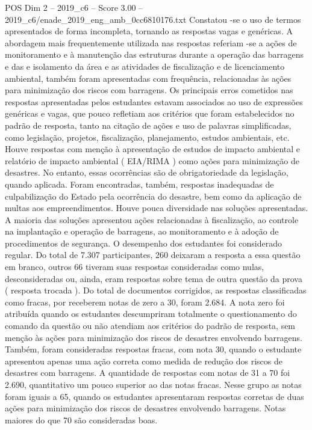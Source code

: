 \begin{textsample}{POS Dim 2 – 2019\_c6 – Score 3.00 – 2019\_c6/enade\_2019\_eng\_amb\_0cc6810176.txt}
Constatou -se o uso de termos apresentados de forma incompleta, tornando as respostas vagas e genéricas.
A abordagem mais frequentemente utilizada nas respostas referiam -se a ações de monitoramento e à manutenção das estruturas durante a operação das barragens e das e isolamento da área e as atividades de fiscalização e de licenciamento ambiental, também foram apresentadas com frequência, relacionadas às ações para minimização dos riscos com barragens.
Os principais erros cometidos nas respostas apresentadas pelos estudantes estavam associados ao uso de expressões genéricas e vagas, que pouco refletiam aos critérios que foram estabelecidos no padrão de resposta, tanto na citação de ações e uso de palavras simplificadas, como legislação, projetos, fiscalização, planejamento, estudos ambientais, etc.
Houve respostas com menção à apresentação de estudos de impacto ambiental e relatório de impacto ambiental ( EIA/RIMA ) como ações para minimização de desastres.
No entanto, essas ocorrências são de obrigatoriedade da legislação, quando aplicada.
Foram encontradas, também, respostas inadequadas de culpabilização do Estado pela ocorrência do desastre, bem como da aplicação de multas aos empreendimentos.
Houve pouca diversidade nas soluções apresentadas.
A maioria das soluções apresentou ações relacionadas à fiscalização, ao controle na implantação e operação de barragens, ao monitoramento e à adoção de procedimentos de segurança.
O desempenho dos estudantes foi considerado regular.
Do total de 7.307 participantes, 260 deixaram a resposta a essa questão em branco, outros 66 tiveram suas respostas consideradas como nulas, desconsideradas ou, ainda, eram respostas sobre tema de outra questão da prova ( resposta trocada ).
Do total de documentos corrigidos, as respostas classificadas como fracas, por receberem notas de zero a 30, foram 2.684.
A nota zero foi atribuída quando os estudantes descumpriram totalmente o questionamento do comando da questão ou não atendiam aos critérios do padrão de resposta, sem menção às ações para minimização dos riscos de desastres envolvendo barragens.
Também, foram consideradas respostas fracas, com nota 30, quando o estudante apresentou apenas uma ação correta como medida de redução dos riscos de desastres com barragens.
A quantidade de respostas com notas de 31 a 70 foi 2.690, quantitativo um pouco superior ao das notas fracas.
Nesse grupo as notas foram iguais a 65, quando os estudantes apresentaram respostas corretas de duas ações para minimização dos riscos de desastres envolvendo barragens.
Notas maiores do que 70 são consideradas boas.

\end{textsample}
